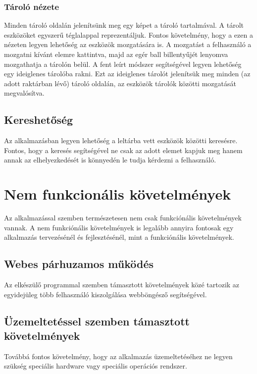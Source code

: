 \subsubsection{Tároló nézete}
Minden tároló oldalán jelenítsünk meg egy képet a tároló tartalmával.
A tárolt eszközöket egyszerű téglalappal reprezentáljuk.
Fontos követelmény, hogy a ezen a nézeten legyen lehetőség az eszközök mozgatására is.
A mozgatást a felhasználó a mozgatni kívánt elemre kattintva, majd az egér ball billentyűjét lenyomva mozgathatja a tárolón belül.
A fent leírt módszer segítségével legyen lehetőség egy ideiglenes tárolóba rakni. 
Ezt az ideiglenes tárolót jelenítsük meg minden (az adott raktárban lévő) tároló oldalán, az eszközök tárolók közötti mozgatását megvalósítva.

\subsection{Kereshetőség}
Az alkalmazásban legyen lehetőség a leltárba vett eszközök közötti keresésre.
Fontos, hogy a keresés segítségével ne csak az adott elemet kapjuk meg hanem annak az elhelyezkedését is könnyedén le tudja kérdezni a felhasználó.

\section{Nem funkcionális követelmények}

Az alkalmazással szemben természetesen nem csak funkciónális követelmények vannak.
A nem funkciónális követelmények is legalább annyira fontosak egy alkalmazás tervezésénél és fejlesztésénél, mint a funkciónális követelmények.

\subsection{Webes párhuzamos működés}

Az elkészülő programmal szemben támasztott követelmények közé tartozik az egyidejüleg több felhasználó kiszolgálása webböngésző segítségével.

\subsection{Üzemeltetéssel szemben támasztott követelmények}

Továbbá fontos követelmény, hogy az alkalmazás üzemeltetéséhez ne legyen szükség speciális hardware vagy speciális operációs rendszer.
